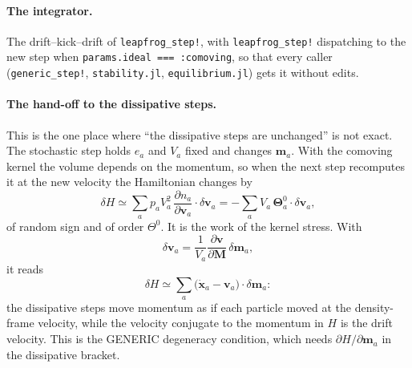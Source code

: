 \documentclass[11pt,aps,preprint,nofootinbib,superscriptaddress,tightenlines]{revtex4-2}
\def\st{\begin{equation}}
\def\stp{\end{equation}}
\let\oldparagraph\paragraph
\renewcommand{\paragraph}{\par\bigskip\oldparagraph}
\begin{document}
\paragraph{The integrator.}  The drift--kick--drift of \texttt{leapfrog\_step!}, with \texttt{leapfrog\_step!} dispatching to the new step
when \texttt{params.ideal === :comoving}, so that every caller (\texttt{generic\_step!}, \texttt{stability.jl}, \texttt{equilibrium.jl})
gets it without edits.

\paragraph{The hand-off to the dissipative steps.}  This is the one place where ``the dissipative steps are unchanged'' is not exact.
The stochastic step holds $e_a$ and $V_a$ fixed and changes $\bm m_a$.  With the comoving kernel the volume depends on the momentum, so when the
next step recomputes it at the new velocity the Hamiltonian changes by
\st
\delta H\simeq\sum_ap_aV_a^2\,\frac{\partial n_a}{\partial\bm v_a}\cdot\delta\bm v_a=-\sum_aV_a\,\bm\Theta^0_a\cdot\delta\bm v_a ,
\stp
of random sign and of order $\Theta^0$.  It is the work of the kernel stress.  With
\st
\delta\bm v_a=\frac1{V_a}\frac{\partial\bm v}{\partial\bm M}\,\delta\bm m_a ,
\stp
it reads
\st
\delta H\simeq\sum_a\big(\dot{\bm x}_a-\bm v_a\big)\cdot\delta\bm m_a :
\stp
the dissipative steps move momentum as if each particle moved at the density-frame velocity, while the velocity conjugate to the
momentum in $H$ is the drift velocity.  This is the GENERIC degeneracy condition, which needs $\partial H/\partial\bm m_a$ in the
dissipative bracket.
\end{document}
